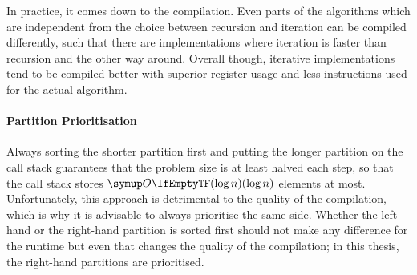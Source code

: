 In practice, it comes down to the compilation.
Even parts of the algorithms which are independent from the choice between recursion and iteration can be compiled differently, such that there are implementations where iteration is faster than recursion and the other way around.
Overall though, iterative implementations tend to be compiled better with superior register usage and less instructions used for the actual \QS{} algorithm.


\paragraph{Partition Prioritisation}
Always sorting the shorter partition first and putting the longer partition on the call stack guarantees that the problem size is at least halved each step, so that the call stack stores \(\bigoh{\log n}\) elements at most.
Unfortunately, this approach is detrimental to the quality of the compilation, which is why it is advisable to always prioritise the same side.
Whether the left-hand or the right-hand partition is sorted first should not make any difference for the runtime but even that changes the quality of the compilation;
in this thesis, the right-hand partitions are prioritised.


